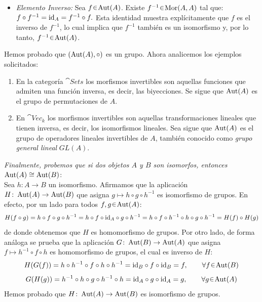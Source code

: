\begin{sol}
\begin{itemize}
    \item \emph{Elemento Inverso:}
    Sea $f \en \aut(A)$. Existe $f^{-1} \en \hom(A,A)$ tal que:
    \(
    f \circ f^{-1} = \operatorname{id}_A = f^{-1} \circ f.
    \)
    Esta identidad muestra explícitamente que $f$ es el inverso de $f^{-1}$, lo cual implica que $f^{-1}$ también es un isomorfismo y, por lo tanto, $f^{-1} \en \aut(A)$.
\end{itemize}
Hemos probado que $(\operatorname{Aut}(A), \circ)$ es un grupo. Ahora analicemos los ejemplos solicitados:
\begin{enumerate}[leftmargin=2.6em]
    \item[1.2.2.] En la categoría $\cat{Sets}$ los morfismos invertibles son aquellas funciones que admiten una función inversa, es decir, las biyecciones. Se sigue que $\operatorname{Aut}(A)$ es el grupo de permutaciones de $A$.
    \item[1.2.3.] En $\cat{Vec}_k$ los morfismos invertibles son aquellas transformaciones lineales que tienen inversa, es decir, los isomorfismos lineales. Sea sigue que $\operatorname{Aut}(A)$ es el grupo de operadores lineales invertibles de $A$, también conocido como \emph{grupo general lineal} $GL(A)$.
\end{enumerate}
\emph{Finalmente, probemos que si dos objetos $A$ y $B$ son isomorfos, entonces $\operatorname{Aut}(A) \cong \operatorname{Aut}(B)$}:\\
Sea $h\colon A \to B$ un isomorfismo. Afirmamos que la aplicación $H\colon \operatorname{Aut}(A) \to \operatorname{Aut}(B)$ que asigna $g \mapsto h\circ g \circ h^{-1}$ es isomorfismo de grupos. En efecto, por un lado para todos $f,g \en \aut(A)$:
\[
H(f\circ g) 
= h\circ f \circ g \circ h^{-1} 
= h\circ f \circ {\operatorname{id}_A} \circ  g \circ h^{-1}
= h\circ f \circ h^{-1} \circ h\circ g \circ h^{-1}
= H(f) \circ H(g)
\]
de donde obtenemos que $H$ es homomorfismo de grupos. Por otro lado, de forma análoga se prueba que la aplicación $G\colon \operatorname{Aut}(B) \to \operatorname{Aut}(A)$ que asigna $f \mapsto h^{-1}\circ f \circ h$ es homomorfismo de grupos, el cual es inverso de $H$:
\[
H(G(f))= h\circ h^{-1}\circ f \circ h\circ h^{-1} = {\id_B} \circ f \circ {\id_B} = f,
\qquad \forall f\en\aut(B)
\]
\[
G(H(g))= h^{-1}\circ h\circ g \circ h^{-1}\circ h = {\id_A} \circ g \circ {\id_A} = g,
\qquad \forall g\en\aut(A)
\]
Hemos probado que $H\colon \operatorname{Aut}(A) \to \operatorname{Aut}(B)$ es isomorfismo de grupos.
\end{sol}
